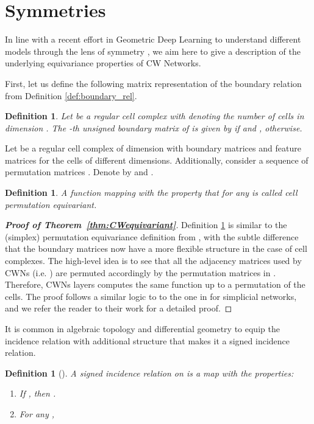 \documentclass{article}
\newtheorem{definition}[theorem]{Definition}
\begin{document}
\section{Symmetries}
\label{app:symmetries}

In line with a recent effort in Geometric Deep Learning to understand different models through the lens of symmetry \citep{Bronstein_etal2017}, we aim here to give a description of the underlying equivariance properties of CW Networks.  

First, let us define the following matrix representation of the boundary relation from Definition \ref{def:boundary_rel}.

\begin{definition}
Let  be a regular cell complex with  denoting the number of cells in dimension . The -th unsigned boundary matrix  of  is given by  if  and , otherwise. 
\end{definition}

Let  be a regular cell complex of dimension  with boundary matrices  and feature matrices  for the cells of different dimensions. Additionally, consider a sequence of permutation matrices . Denote by  and .

\begin{definition}
\label{def:equiv}
A function  mapping  with the property that  for any  is called cell permutation equivariant. 
\end{definition}

\begin{proof}[\textbf{Proof of Theorem~\ref{thm:CWequivariant}}]
Definition \ref{def:equiv} is similar to the (simplex) permutation equivariance definition from \citet{bodnar2021weisfeiler}, with the subtle difference that the boundary matrices now have a more flexible structure in the case of cell complexes. The high-level idea is to see that all the adjacency matrices used by CWNs (i.e. ) are permuted accordingly by the permutation matrices in . Therefore, CWNs layers computes the same function up to a permutation of the cells. The proof follows a similar logic to to the one in \citet{bodnar2021weisfeiler} for simplicial networks, and we refer the reader to their work for a detailed proof.   
\end{proof}


It is common in algebraic topology and differential geometry to equip the incidence relation  with additional structure that makes it a signed incidence relation.  

\begin{definition}[\citet{HGh19}]
\label{def:signed_inc}
A signed incidence relation on  is a map  with the properties:
\begin{enumerate}[leftmargin=*]
    \item If , then . 
    \item For any , 
\end{enumerate}
\end{definition}
\end{document}
